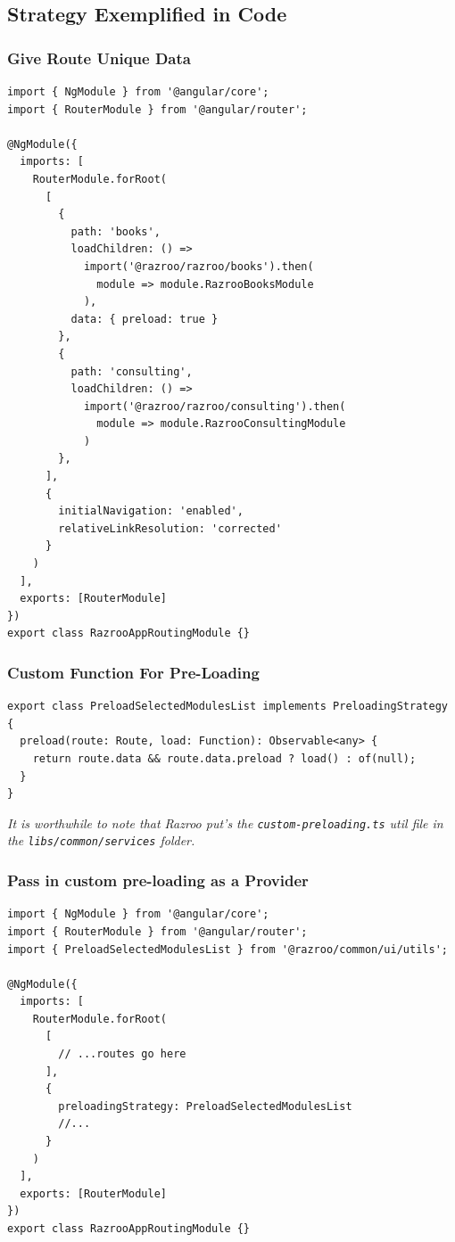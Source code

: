 \subsection{Strategy Exemplified in Code}
\subsubsection{Give Route Unique Data}
\begin{lstlisting}[caption=app.routing.module.ts]
import { NgModule } from '@angular/core';
import { RouterModule } from '@angular/router';

@NgModule({
  imports: [
    RouterModule.forRoot(
      [
        {
          path: 'books',
          loadChildren: () =>
            import('@razroo/razroo/books').then(
              module => module.RazrooBooksModule
            ),
          data: { preload: true }
        },
        {
          path: 'consulting',
          loadChildren: () =>
            import('@razroo/razroo/consulting').then(
              module => module.RazrooConsultingModule
            )
        },
      ],
      {
        initialNavigation: 'enabled',
        relativeLinkResolution: 'corrected'
      }
    )
  ],
  exports: [RouterModule]
})
export class RazrooAppRoutingModule {}
\end{lstlisting}

\subsubsection{Custom Function For Pre-Loading}
\begin{lstlisting}[caption=custom-preloading.ts]
export class PreloadSelectedModulesList implements PreloadingStrategy {
  preload(route: Route, load: Function): Observable<any> {
    return route.data && route.data.preload ? load() : of(null);
  }
}
\end{lstlisting}

\textit{It is worthwhile to note that Razroo put's the \lstinline{custom-preloading.ts} 
util file in the \lstinline{libs/common/services} folder.}

\subsubsection{Pass in custom pre-loading as a Provider}
\begin{lstlisting}[caption=app.routing.module.ts]
import { NgModule } from '@angular/core';
import { RouterModule } from '@angular/router';
import { PreloadSelectedModulesList } from '@razroo/common/ui/utils';

@NgModule({
  imports: [
    RouterModule.forRoot(
      [
        // ...routes go here
      ],
      {
        preloadingStrategy: PreloadSelectedModulesList
        //...
      }
    )
  ],
  exports: [RouterModule]
})
export class RazrooAppRoutingModule {}
\end{lstlisting}

